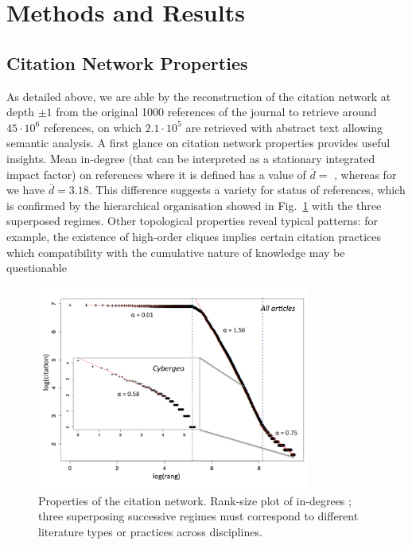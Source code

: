 \section*{Methods and Results}
\label{sec:results}



\subsection*{Citation Network Properties}


As detailed above, we are able by the reconstruction of the citation network at depth $\pm 1$ from the original 1000 references of the journal to retrieve around $45\cdot 10^6$ references, on which $2.1\cdot 10^5$ are retrieved with abstract text allowing semantic analysis. A first glance on citation network properties provides useful insights. Mean in-degree (that can be interpreted as a stationary integrated impact factor) on references where it is defined has a value of $\bar{d}=$ %
, whereas for \cite{cybergeo} we have $\bar{d}=3.18$. This difference suggests a variety for status of references, which is confirmed by the hierarchical organisation showed in Fig.~\ref{fig:ranksize} with the three superposed regimes. Other topological properties reveal typical patterns: for example, the existence of high-order cliques implies certain citation practices which compatibility with the cumulative nature of knowledge may be questionable~\cite{} %




\begin{figure}
\centering
\includegraphics[width=0.8\textwidth]{figures/ranksize.pdf}
\caption[Properties of the citation network]{Properties of the citation network. Rank-size plot of in-degrees ; three superposing successive regimes must correspond to different literature types or practices across disciplines.}
\label{fig:ranksize}
\end{figure}


